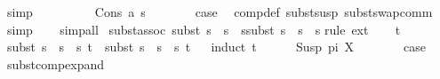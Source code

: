 \begin{isabellebody}
\ simp\isanewline
\ \ \ \isamarkupfalse%
\isanewline
\ \ \ \ \isamarkupfalse%
\ {\isacharparenleft}{\kern0pt}Cons\ a\ s{}{\isacharparenright}{\kern0pt}\isanewline
\ \ \ \ \isamarkupfalse%
\ \isamarkupfalse%
\ {\isacharquery}{\kern0pt}case\ \isamarkupfalse%
\ comp{\isacharunderscore}{\kern0pt}def\ subst{\isacharunderscore}{\kern0pt}susp\ subst{\isacharunderscore}{\kern0pt}swap{\isacharunderscore}{\kern0pt}comm\ \isamarkupfalse%
\ simp\isanewline
\ \ \isamarkupfalse%
\isanewline
{}\isamarkupfalse%
\ {\isacharparenleft}{\kern0pt}simp{\isacharunderscore}{\kern0pt}all{\isacharparenright}{\kern0pt}%
\endisatagproof
{\isafoldproof}%
%
\isadelimproof
\isanewline
%
\endisadelimproof
\isanewline
\isanewline
\isanewline
{}\isamarkupfalse%
\ subst{\isacharunderscore}{\kern0pt}assoc{\isacharcolon}{\kern0pt}\ {\isachardoublequoteopen}subst\ {\isacharparenleft}{\kern0pt}s{}\ {\isasymbullet}\ {\isacharparenleft}{\kern0pt}s{}\ {\isasymbullet}\ s{}{\isacharparenright}{\kern0pt}{\isacharparenright}{\kern0pt}{\isacharequal}{\kern0pt}subst\ {\isacharparenleft}{\kern0pt}{\isacharparenleft}{\kern0pt}s{}\ {\isasymbullet}\ s{}{\isacharparenright}{\kern0pt}\ {\isasymbullet}\ s{}{\isacharparenright}{\kern0pt}{\isachardoublequoteclose}\isanewline
%
\isadelimproof
%
\endisadelimproof
%
\isatagproof
{}\isamarkupfalse%
{\isacharparenleft}{\kern0pt}rule\ ext{\isacharparenright}{\kern0pt}\isanewline
\ \ \isamarkupfalse%
\ t\ \isanewline
\ \ \isamarkupfalse%
\ {\isachardoublequoteopen}subst\ {\isacharparenleft}{\kern0pt}s{}\ {\isasymbullet}\ {\isacharparenleft}{\kern0pt}s{}\ {\isasymbullet}\ s{}{\isacharparenright}{\kern0pt}{\isacharparenright}{\kern0pt}\ t\ {\isacharequal}{\kern0pt}\ subst\ {\isacharparenleft}{\kern0pt}s{}\ {\isasymbullet}\ s{}\ {\isasymbullet}\ s{}{\isacharparenright}{\kern0pt}\ t{\isachardoublequoteclose}\isanewline
\ \ \isamarkupfalse%
{\isacharparenleft}{\kern0pt}induct\ t{\isacharparenright}{\kern0pt}\isanewline
\ \ \ \ \isamarkupfalse%
\ {\isacharparenleft}{\kern0pt}Susp\ pi\ X{\isacharparenright}{\kern0pt}\isanewline
\ \ \ \ \isamarkupfalse%
\ \isamarkupfalse%
\ {\isacharquery}{\kern0pt}case\ \isamarkupfalse%
\ subst{\isacharunderscore}{\kern0pt}comp{\isacharunderscore}{\kern0pt}expand\ \isamarkupfalse%

\end{isabellebody}
